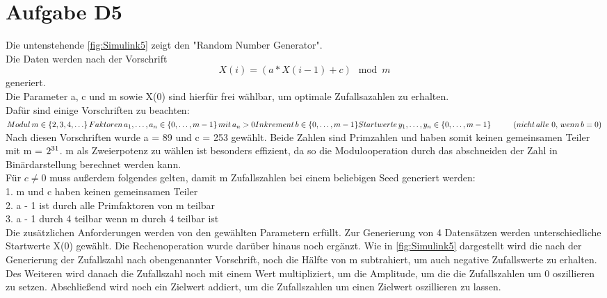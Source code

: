 
\chapter{Aufgabe D5}
Die untenstehende \autoref{fig:Simulink5} zeigt den "Random Number Generator". \\
Die Daten werden nach der Vorschrift$$ X(i) = (a*X(i-1)+c)\mod m$$ generiert.\\
Die Parameter a, c und m sowie X(0) sind hierfür frei wählbar, um optimale Zufallsazahlen zu erhalten.\\
Dafür sind einige Vorschriften zu beachten:\\ 
$ Modul \thinspace {\displaystyle m\in \{2,3,4,\ldots \}} \\
\thinspace Faktoren\thinspace {\displaystyle a_{1},\ldots ,a_{n}\in \left\{0,\ldots ,m-1\right\}}\thinspace mit \thinspace{\displaystyle a_{n}>0}\\
Inkrement\thinspace {\displaystyle b\in \left\{0,\ldots ,m-1\right\}}\\
Startwerte \thinspace{\displaystyle y_{1},\ldots ,y_{n}\in \left\{0,\ldots ,m-1\right\}} \hspace{1cm}(nicht\thinspace alle\thinspace\thinspace 0, \thinspace wenn\thinspace {\displaystyle b=0} )
$\\

Nach diesen Vorschriften wurde a = 89 und c = 253 gewählt. Beide Zahlen sind Primzahlen und haben somit keinen gemeinsamen Teiler mit m = $2\textsuperscript{31}$.
m als Zweierpotenz zu wählen ist besonders effizient, da so die Modulooperation durch das abschneiden der Zahl in Binärdarstellung berechnet werden kann.\\
Für $c \neq 0$ muss außerdem folgendes gelten, damit m Zufallszahlen bei einem beliebigen Seed generiert werden:\\
1. m und c haben keinen gemeinsamen Teiler\\
2. a - 1 ist durch alle Primfaktoren von m teilbar\\
3. a - 1 durch 4 teilbar wenn  m durch 4 teilbar ist\\
Die zusätzlichen  Anforderungen werden von den gewählten Parametern erfüllt. Zur Generierung von 4 Datensätzen werden unterschiedliche Startwerte X(0) gewählt.
Die Rechenoperation wurde darüber hinaus noch ergänzt. Wie in \autoref{fig:Simulink5} dargestellt wird die nach der Generierung der Zufallszahl nach obengenannter Vorschrift, noch die Hälfte von m subtrahiert, um auch negative Zufallswerte zu erhalten. Des Weiteren wird danach die Zufallszahl noch mit einem Wert multipliziert, um die Amplitude, um die die Zufallszahlen um 0 oszillieren zu setzen. Abschließend wird noch ein Zielwert addiert, um die Zufallszahlen um einen Zielwert oszillieren zu lassen.

